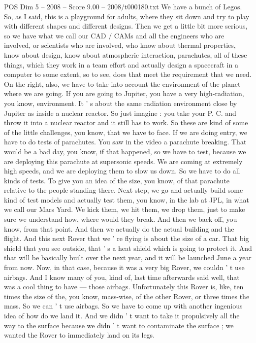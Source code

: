 \begin{textsample}{POS Dim 5 – 2008 – Score 9.00 – 2008/t000180.txt}
We have a bunch of Legos.
So, as I said, this is a playground for adults, where they sit down and try to play with different shapes and different designs.
Then we get a little bit more serious, so we have what we call our CAD / CAMs and all the engineers who are involved, or scientists who are involved, who know about thermal properties, know about design, know about atmospheric interaction, parachutes, all of these things, which they work in a team effort and actually design a spacecraft in a computer to some extent, so to see, does that meet the requirement that we need.
On the right, also, we have to take into account the environment of the planet where we are going.
If you are going to Jupiter, you have a very high-radiation, you know, environment.
It ' s about the same radiation environment close by Jupiter as inside a nuclear reactor.
So just imagine : you take your P.
C. and throw it into a nuclear reactor and it still has to work.
So these are kind of some of the little challenges, you know, that we have to face.
If we are doing entry, we have to do tests of parachutes.
You saw in the video a parachute breaking.
That would be a bad day, you know, if that happened, so we have to test, because we are deploying this parachute at supersonic speeds.
We are coming at extremely high speeds, and we are deploying them to slow us down.
So we have to do all kinds of tests.
To give you an idea of the size, you know, of that parachute relative to the people standing there.
Next step, we go and actually build some kind of test models and actually test them, you know, in the lab at JPL, in what we call our Mars Yard.
We kick them, we hit them, we drop them, just to make sure we understand how, where would they break.
And then we back off, you know, from that point.
And then we actually do the actual building and the flight.
And this next Rover that we ' re flying is about the size of a car.
That big shield that you see outside, that ' s a heat shield which is going to protect it.
And that will be basically built over the next year, and it will be launched June a year from now.
Now, in that case, because it was a very big Rover, we couldn ' t use airbags.
And I know many of you, kind of, last time afterwards said well, that was a cool thing to have — those airbags.
Unfortunately this Rover is, like, ten times the size of the, you know, mass-wise, of the other Rover, or three times the mass.
So we can ' t use airbags.
So we have to come up with another ingenious idea of how do we land it.
And we didn ' t want to take it propulsively all the way to the surface because we didn ' t want to contaminate the surface ; we wanted the Rover to immediately land on its legs.

\end{textsample}
